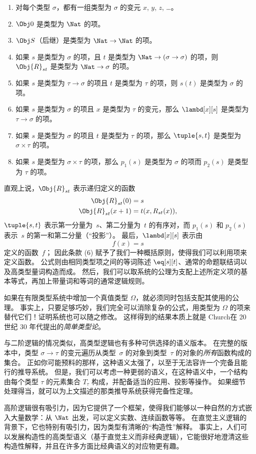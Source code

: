 \documentclass[../../../include/open-logic-section]{subfiles}
\begin{document}
\begin{enumerate}
\item 对每个类型 $\sigma$，都有一组类型为 $\sigma$ 的变元 $x$, $y$, $z$, \dots。
\item $\Obj 0$ 是类型为 $\Nat$ 的项。
\item $\Obj S$（后继）是类型为 $\Nat \to \Nat$ 的项。
\item 如果 $s$ 是类型为 $\sigma$ 的项，且 $t$ 是类型为 $\Nat \to (\sigma \to \sigma)$ 的项，则 $\Obj{R}_{st}$ 是类型为 $\Nat \to \sigma$ 的项。
\item 如果 $s$ 是类型为 $\tau \to \sigma$ 的项且 $t$ 是类型为 $\tau$ 的项，则 $s(t)$ 是类型为 $\sigma$ 的项。
\item 如果 $s$ 是类型为 $\sigma$ 的项且 $x$ 是类型为 $\tau$ 的变元，那么 $\lambd[x][s]$ 是类型为 $\tau \to \sigma$ 的项。
\item 如果 $s$ 是类型为 $\sigma$ 的项且 $t$ 是类型为 $\tau$ 的项，那么 $\tuple{s, t}$ 是类型为 $\sigma \times \tau$ 的项。
\item 如果 $s$ 是类型为 $\sigma \times \tau$ 的项，那么 $p_1(s)$ 是类型为 $\sigma$ 的项而 $p_2(s)$ 是类型为 $\tau$ 的项。
\end{enumerate}

直观上说，$\Obj{R}_{st}$ 表示递归定义的函数 \begin{align*}
\Obj{R}_{st}(0) & = s \\
\Obj{R}_{st}(x+1) & = t(x, R_{st}(x)),
\end{align*}
$\tuple{s, t}$ 表示第一分量为~$s$、第二分量为~$t$ 的有序对，而 $p_1(s)$ 和 $p_2(s)$ 表示~$s$ 的第一和第二分量（“投影”）。
最后，$\lambd[x][s]$ 表示由 \[
f(x) = s
\] 定义的函数~$f$；
因此条款 (6) 赋予了我们一种概括原则，使得我们可以利用项来定义函数。
公式则由相同类型项之间的等词陈述 $\eq[s][t]$、通常的命题联结词以及高类型量词构造而成。
然后，我们可以取系统的公理为支配上述所定义项的基本等式，再加上带量词和等词的通常逻辑规则。

如果在有限类型系统中增加一个真值类型 $\Omega$，就必须同时包括支配其使用的公理。
事实上，只要足够巧妙，我们完全可以消除复杂的公式，用类型为 $\Omega$ 的项来替代它们！证明系统也可以随之修改。
这样得到的结果本质上就是 Church在 20 世纪 30 年代提出的\emph{简单类型论}。

与二阶逻辑的情况类似，高类型逻辑也有多种可供选择的语义版本。
在完整的版本中，类型 $\sigma \to \tau$ 的变元遍历从类型~$\sigma$ 的对象到类型~$\tau$ 的对象的\emph{所有}函数构成的集合。
正如你可能预料的那样，这种语义太强了，以至于无法容许一个完备且能行的推导系统。
但是，我们可以考虑一种更弱的语义，在这种语义中，一个结构由每个类型 $\tau$ 的元素集合 $T_\tau$ 构成，并配备适当的应用、投影等操作。
如果细节处理得当，就可以为上文描述的那类推导系统获得完备性定理。

高阶逻辑很有吸引力，因为它提供了一个框架，使得我们能够以一种自然的方式嵌入大量数学：从 $\Nat$ 出发，可以定义实数、连续函数等等。
在直觉主义逻辑的背景下，它也特别有吸引力，因为类型有清晰的“构造性”解释。
事实上，人们可以发展构造性的高类型语义（基于直觉主义而非经典逻辑），它能很好地澄清这些构造性解释，并且在许多方面比经典语义的对应物更有趣。
\end{document}
